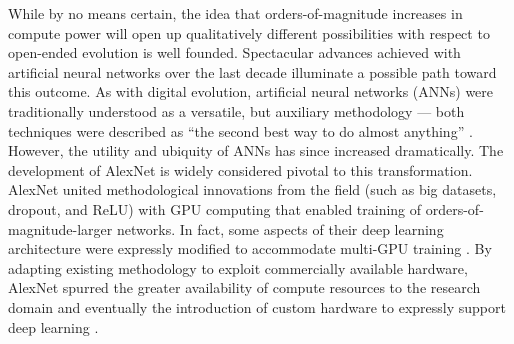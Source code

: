 While by no means certain, the idea that orders-of-magnitude increases in compute power will open up qualitatively different possibilities with respect to open-ended evolution is %
well founded.
Spectacular advances achieved with artificial neural networks over the last decade illuminate a possible path toward this outcome.
As with digital evolution, artificial neural networks (ANNs) were traditionally understood as a versatile, but auxiliary methodology --- both techniques were described %
as ``the second best way to do almost anything'' \citep{miaoulis2008intelligent, eiben2015introduction}.
However, the utility and ubiquity of ANNs has since increased dramatically.
The development of AlexNet is widely considered pivotal to this transformation.
AlexNet united methodological innovations from the field (such as big datasets, dropout, and ReLU) with GPU computing that enabled training of orders-of-magnitude-larger networks.
In fact, some aspects of their deep learning architecture were expressly modified to accommodate multi-GPU training \citep{krizhevsky2012imagenet}.
By adapting existing methodology to 
exploit commercially available hardware, AlexNet spurred the greater availability of compute resources to the research domain and eventually the introduction of custom hardware to expressly support deep learning \citep{jouppi2017datacenter}.

